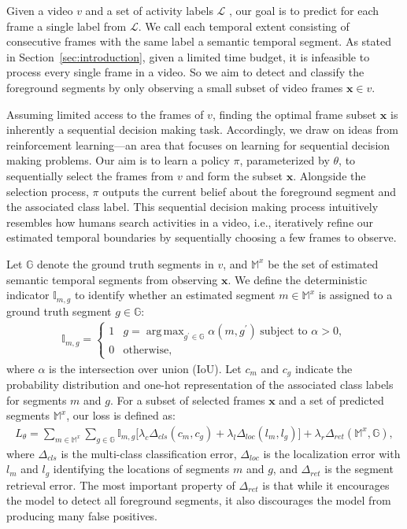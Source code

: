 \documentclass{bmvc2k}
\DeclareMathOperator*{\argmax}{arg\,max}
\def\x{\boldsymbol{x}}
\begin{document}
Given a video $v$ and a set of activity labels $\mathcal{L}$ , our goal is to predict for each frame a single label from $\mathcal{L}$. We call each temporal extent consisting of consecutive frames with the same label a semantic temporal segment. As stated in Section~\ref{sec:introduction}, given a limited time budget, it is infeasible to process every single frame in a video. So we aim to detect and classify the foreground segments by only observing a small subset of video frames $\x \in v$. 

Assuming limited access to the frames of $v$, finding the optimal frame subset $\x$ is inherently a sequential decision making task. Accordingly, we draw on ideas from reinforcement learning---an area that focuses on learning for sequential decision making problems. Our aim is to learn a policy $\pi$, parameterized by $\theta$, to sequentially select the frames from $v$ and form the subset $\x$. Alongside the selection process, $\pi$ outputs the current belief about the foreground segment and the associated class label. This sequential decision making process intuitively resembles how humans search activities in a video, i.e., iteratively refine our estimated temporal boundaries by sequentially choosing a few frames to observe.         

Let $\mathbb{G}$ denote the ground truth segments in $v$, and $\mathbb{M}^x$ be the set of estimated semantic temporal segments from observing $\x$. We define the deterministic indicator $\mathbb{I}_{m, g}$ to identify whether an estimated segment $m \in \mathbb{M}^x$ is assigned to a ground truth segment $g \in \mathbb{G}$:
\begin{eqnarray}
\displaystyle \mathbb{I}_{m, g} = \begin{cases} 
1 & g =\argmax_{g^\prime \in \mathbb{G}} \alpha (m ,g^\prime) \hspace{3pt} \text{subject to } \alpha > 0, \\
0 & \text{otherwise},
\end{cases}
\end{eqnarray}
\noindent where $\alpha$ is the intersection over union (IoU). Let $c_m$ and $c_g$ indicate the probability distribution and one-hot representation of the associated class labels for segments $m$ and $g$. For a subset of selected frames $\x$ and a set of predicted segments $\mathbb{M}^x$, our loss is defined as:
\begin{eqnarray}\label{eq:loss}
L_\theta = \sum_{m \in \mathbb{M}^x}\sum_{g \in \mathbb{G}} \mathbb{I}_{m, g} \Big[ \lambda_{c} \Delta_{cls} (c_m, c_g) + \lambda_{l} \Delta_{loc} (l_m, l_{g}) \Big] + \lambda_{r} \Delta_{ret}(\mathbb{M}^x, \mathbb{G}), 
\end{eqnarray}
\noindent where $\Delta_{cls}$ is the multi-class classification error, $\Delta_{loc}$ is the localization error with $l_m$ and $l_g$ identifying the locations of segments $m$ and $g$, and $\Delta_{ret}$ is the segment retrieval error. The most important property of $\Delta_{ret}$ is that while it encourages the model to detect all foreground segments, it also discourages the model from producing many false positives. 
\end{document}

